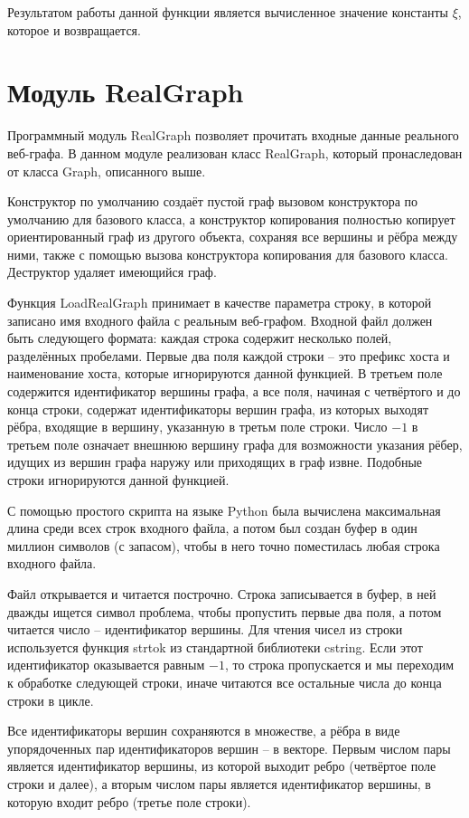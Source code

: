 \documentclass[14pt]{extreport}
\begin{document}
Результатом работы данной функции является вычисленное значение константы $\xi$, которое и возвращается.

\section{Модуль RealGraph}

Программный модуль RealGraph позволяет прочитать входные данные реального веб-графа. В данном модуле реализован класс RealGraph, который пронаследован от класса Graph, описанного выше.

Конструктор по умолчанию создаёт пустой граф вызовом конструктора по умолчанию для базового класса, а конструктор копирования полностью копирует ориентированный граф из другого объекта, сохраняя все вершины и рёбра между ними, также с помощью вызова конструктора копирования для базового класса. Деструктор удаляет имеющийся граф.

Функция LoadRealGraph принимает в качестве параметра строку, в которой записано имя входного файла с реальным веб-графом. Входной файл должен быть следующего формата: каждая строка содержит несколько полей, разделённых пробелами. Первые два поля каждой строки -- это префикс хоста и наименование хоста, которые игнорируются данной функцией. В третьем поле содержится идентификатор вершины графа, а все поля, начиная с четвёртого и до конца строки, содержат идентификаторы вершин графа, из которых выходят рёбра, входящие в вершину, указанную в третьм поле строки. Число $-1$ в третьем поле означает внешнюю вершину графа для возможности указания рёбер, идущих из вершин графа наружу или приходящих в граф извне. Подобные строки игнорируются данной функцией.

С помощью простого скрипта на языке Python была вычислена максимальная длина среди всех строк входного файла, а потом был создан буфер в один миллион символов (с запасом), чтобы в него точно поместилась любая строка входного файла.

Файл открывается и читается построчно. Строка записывается в буфер, в ней дважды ищется символ проблема, чтобы пропустить первые два поля, а потом читается число -- идентификатор вершины. Для чтения чисел из строки используется функция strtok из стандартной библиотеки cstring. Если этот идентификатор оказывается равным $-1$, то строка пропускается и мы переходим к обработке следующей строки, иначе читаются все остальные числа до конца строки в цикле.

Все идентификаторы вершин сохраняются в множестве, а рёбра в виде упорядоченных пар идентификаторов вершин -- в векторе. Первым числом пары является идентификатор вершины, из которой выходит ребро (четвёртое поле строки и далее), а вторым числом пары является идентификатор вершины, в которую входит ребро (третье поле строки).
\end{document}
